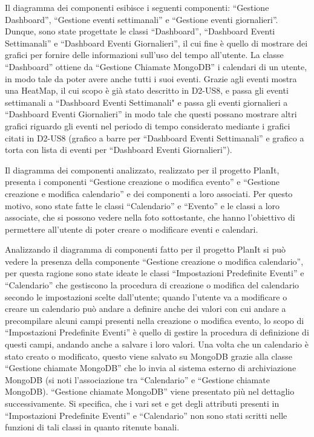 \begin{listaPersonale}[DCL]{}
    Il diagramma dei componenti esibisce i seguenti componenti: “Gestione Dashboard”, “Gestione eventi settimanali” e “Gestione eventi giornalieri”. Dunque, sono state progettate le classi “Dashboard”, “Dashboard Eventi Settimanali” e “Dashboard Eventi Giornalieri”, il cui fine è quello di mostrare dei grafici per fornire delle informazioni sull'uso del tempo all'utente.
    La classe “Dashboard” ottiene da “Gestione Chiamate MongoDB” i calendari di un utente, in modo tale da poter avere anche tutti i suoi eventi. Grazie agli eventi mostra una HeatMap, il cui scopo è già stato descritto in D2-US8, e passa gli eventi settimanali a “Dashboard Eventi Settimanali" e passa gli eventi giornalieri a “Dashboard Eventi Giornalieri” in modo tale che questi possano mostrare altri grafici riguardo gli eventi nel periodo di tempo considerato mediante i grafici citati in D2-US8 (grafico a barre per “Dashboard Eventi Settimanali” e grafico a torta con lista di eventi per “Dashboard Eventi Giornalieri”).



    Il diagramma dei componenti analizzato, realizzato per il progetto PlanIt, presenta i componenti “Gestione creazione o modifica evento” e “Gestione creazione e modifica calendario” e dei componenti a loro associati. Per questo motivo, sono state fatte le classi “Calendario” e “Evento” e le classi a loro associate, che si possono vedere nella foto sottostante, che hanno l'obiettivo di permettere all'utente di poter creare o modificare eventi e calendari.


    \begin{listaPersonale2}[DCL]{}

        Analizzando il diagramma di componenti fatto per il progetto PlanIt si può vedere la presenza della componente “Gestione creazione o modifica calendario”, per questa ragione sono state ideate le classi “Impostazioni Predefinite Eventi” e “Calendario”  che gestiscono la procedura di creazione o modifica del calendario secondo le impostazioni scelte dall'utente; quando l'utente va a modificare o creare un calendario può andare a definire anche dei valori con cui andare a precompilare alcuni campi presenti nella creazione o modifica evento, lo scopo di “Impostazioni Predefinite Eventi” è quello di gestire la procedura di definizione di questi campi, andando anche a salvare i loro valori. Una volta che un calendario è stato creato o modificato, questo viene salvato su MongoDB grazie alla classe “Gestione chiamate MongoDB” che lo invia al sistema esterno di archiviazione MongoDB (si noti l'associazione tra “Calendario” e “Gestione chiamate MongoDB).
        “Gestione chiamate MongoDB” viene presentato più nel dettaglio successivamente.
        Si specifica, che i vari set e get degli attributi presenti in “Impostazioni Predefinite Eventi” e “Calendario” non sono stati scritti nelle funzioni di tali classi in quanto ritenute banali.



\end{listaPersonale2}
\end{listaPersonale}
